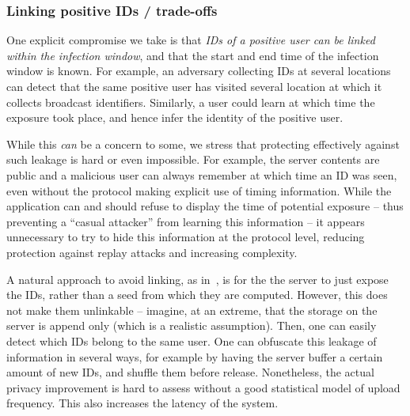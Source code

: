 \documentclass{article}
\begin{document}
\subsubsection{Linking positive IDs / trade-offs} 

One explicit compromise we take is that {\em IDs of a positive user can be linked within the infection window}, and that the start and end time of the infection window is known. For example, an adversary collecting IDs at several locations can detect that the same positive user has visited several location at which it collects broadcast identifiers. Similarly, a user could learn at which time the exposure took place, and hence infer the identity of the positive user.  

While this {\em can} be a concern to some, we stress that protecting effectively against such leakage is hard or even impossible. For example, the server contents are public and a malicious user can always remember at which time an ID was seen, even without the protocol making explicit use of timing information. While the application can and should refuse to display the time of potential exposure -- thus preventing a ``casual attacker'' from learning this information -- it appears unnecessary to try to hide this information at the protocol level, reducing protection against replay attacks and increasing complexity.


A natural approach to avoid linking, as in~\cite{BU}, is for the the server to just expose the IDs, rather than a seed from which they are computed. However, this does not make them unlinkable -- imagine, at an extreme, that the storage on the server is append only (which is a realistic assumption). Then, one can easily detect which IDs belong to the same user. One can obfuscate this leakage of information in several ways, for example by having the server buffer a certain amount of new IDs, and shuffle them before release. Nonetheless, the actual privacy improvement is  hard to assess without a good statistical model of upload frequency. This also increases the latency of the system.

\end{document}
